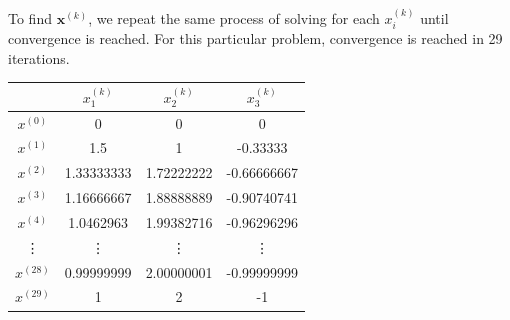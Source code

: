 To find $\mathbf{x}^{(k)}$, we repeat the same process of solving for each $x^{(k)}_i$ until convergence is reached. For this particular problem, convergence is reached in 29 iterations.

\begin{center}
\begin{tabular}{ c|c c c  }
          & $x^{(k)}_1$ & $x^{(k)}_2$ & $x^{(k)}_3$ \\
    \hline
    $x^{(0)}$ & 0 & 0 & 0 \\
    $x^{(1)}$ & 1.5 & 1 & -0.33333 \\
    $x^{(2)}$ & 1.33333333 & 1.72222222 & -0.66666667 \\
    $x^{(3)}$ & 1.16666667 & 1.88888889 & -0.90740741 \\
    $x^{(4)}$ & 1.0462963 & 1.99382716 & -0.96296296 \\
    \vdots    & \vdots    & \vdots     & \vdots     \\
    $x^{(28)}$ & 0.99999999 & 2.00000001 & -0.99999999 \\
    $x^{(29)}$ & 1 & 2 & -1 \\
\end{tabular}
\end{center}


